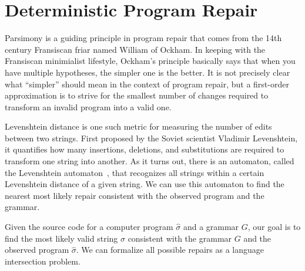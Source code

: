 \chapter{\rm\bfseries Deterministic Program Repair}
\label{ch:chapter02}

Parsimony is a guiding principle in program repair that comes from the 14th century Fransiscan friar named William of Ockham. In keeping with the Fransiscan minimialist lifestyle, Ockham's principle basically says that when you have multiple hypotheses, the simpler one is the better. It is not precisely clear what ``simpler'' should mean in the context of program repair, but a first-order approximation is to strive for the smallest number of changes required to transform an invalid program into a valid one.

Levenshtein distance is one such metric for measuring the number of edits between two strings. First proposed by the Soviet scientist Vladimir Levenshtein, it quantifies how many insertions, deletions, and substitutions are required to transform one string into another. As it turns out, there is an automaton, called the Levenshtein automaton~\cite{schulz2002fast}, that recognizes all strings within a certain Levenshtein distance of a given string. We can use this automaton to find the nearest most likely repair consistent with the observed program and the grammar.

Given the source code for a computer program $\hat\sigma$ and a grammar $G$, our goal is to find the most likely valid string $\sigma$ consistent with the grammar $G$ and the observed program $\hat\sigma$. We can formalize all possible repairs as a language intersection problem.